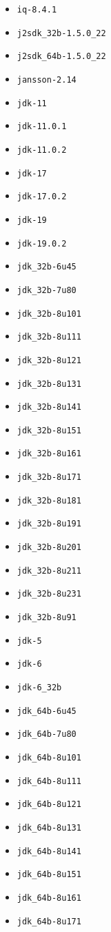 \begin{multicols}{3}
\begin{itemize}
\item \verb|iq-8.4.1|
\item \verb|j2sdk_32b-1.5.0_22|
\item \verb|j2sdk_64b-1.5.0_22|
\item \verb|jansson-2.14|
\item \verb|jdk-11|
\item \verb|jdk-11.0.1|
\item \verb|jdk-11.0.2|
\item \verb|jdk-17|
\item \verb|jdk-17.0.2|
\item \verb|jdk-19|
\item \verb|jdk-19.0.2|
\item \verb|jdk_32b-6u45|
\item \verb|jdk_32b-7u80|
\item \verb|jdk_32b-8u101|
\item \verb|jdk_32b-8u111|
\item \verb|jdk_32b-8u121|
\item \verb|jdk_32b-8u131|
\item \verb|jdk_32b-8u141|
\item \verb|jdk_32b-8u151|
\item \verb|jdk_32b-8u161|
\item \verb|jdk_32b-8u171|
\item \verb|jdk_32b-8u181|
\item \verb|jdk_32b-8u191|
\item \verb|jdk_32b-8u201|
\item \verb|jdk_32b-8u211|
\item \verb|jdk_32b-8u231|
\item \verb|jdk_32b-8u91|
\item \verb|jdk-5|
\item \verb|jdk-6|
\item \verb|jdk-6_32b|
\item \verb|jdk_64b-6u45|
\item \verb|jdk_64b-7u80|
\item \verb|jdk_64b-8u101|
\item \verb|jdk_64b-8u111|
\item \verb|jdk_64b-8u121|
\item \verb|jdk_64b-8u131|
\item \verb|jdk_64b-8u141|
\item \verb|jdk_64b-8u151|
\item \verb|jdk_64b-8u161|
\item \verb|jdk_64b-8u171|

\end{itemize}
\end{multicols}
